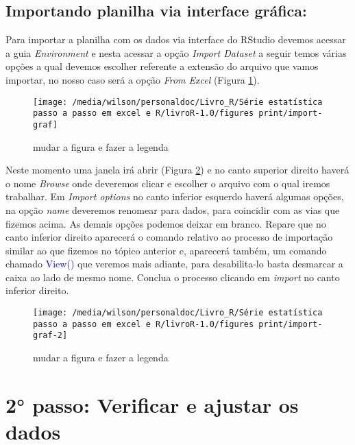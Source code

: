 \documentclass[14pt,titlepage, oneside, openany, a4paper]{book}
\begin{document}
\hypertarget{importando-planilha-via-interface-gruxe1fica}{%
\subsection{Importando planilha via interface gráfica:}\label{importando-planilha-via-interface-gruxe1fica}}

Para importar a planilha com os dados via interface do RStudio devemos acessar a guia \emph{Environment} e nesta acessar a opção \emph{Import Dataset} a seguir temos várias opções a qual devemos escolher referente a extensão do arquivo que vamos importar, no nosso caso será a opção \emph{From Excel} (Figura \ref{fig:import-graf}).

\begin{figure}[H]
\texttt{[image: /media/wilson/personaldoc/Livro\_R/Série estatística passo a passo em excel e R/livroR-1.0/figures print/import-graf]} \caption{mudar a figura e fazer a legenda}\label{fig:import-graf}
\end{figure}

Neste momento uma janela irá abrir (Figura \ref{fig:import-graf-2}) e no canto superior direito haverá o nome \emph{Browse} onde deveremos clicar e escolher o arquivo com o qual iremos trabalhar. Em \emph{Import options} no canto inferior esquerdo haverá algumas opções, na opção \emph{name} deveremos renomear para dados, para coincidir com as vias que fizemos acima. As demais opções podemos deixar em branco. Repare que no canto inferior direito aparecerá o comando relativo ao processo de importação similar ao que fizemos no tópico anterior e, aparecerá também, um comando chamado \textcolor{blue}{View()} que veremos mais adiante, para desabilita-lo basta desmarcar a caixa ao lado de mesmo nome. Conclua o processo clicando em \emph{import} no canto inferior direito.

\begin{figure}[H]
\texttt{[image: /media/wilson/personaldoc/Livro\_R/Série estatística passo a passo em excel e R/livroR-1.0/figures print/import-graf-2]} \caption{mudar a figura e fazer a legenda}\label{fig:import-graf-2}
\end{figure}

\hypertarget{passo-verificar-e-ajustar-os-dados}{%
\section{2° passo: Verificar e ajustar os dados}\label{passo-verificar-e-ajustar-os-dados}}
\end{document}
